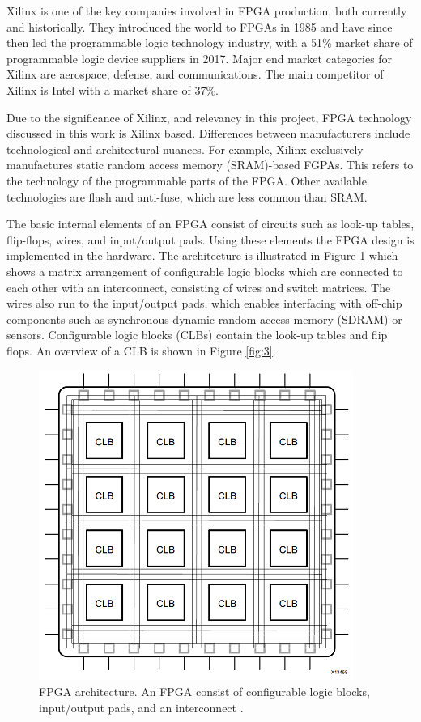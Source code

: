 \documentclass[12pt]{report}
\begin{document}
\par
Xilinx is one of the key companies involved in FPGA production, both currently and historically. They introduced the world to FPGAs in 1985 and have since then led the programmable logic technology industry, with a 51\% market share of programmable logic device suppliers in 2017. Major end market categories for Xilinx are aerospace, defense, and communications. The main competitor of Xilinx is Intel with a market share of 37\%. \citep{XilHist}\citep{XilShare}
\par 
Due to the significance of Xilinx, and relevancy in this project, FPGA technology discussed in this work is Xilinx based. Differences between manufacturers include technological and architectural nuances. For example, Xilinx exclusively manufactures static random access memory (SRAM)-based FGPAs. This refers to the technology of the programmable parts of the FPGA. Other available technologies are flash and anti-fuse, which are less common than SRAM. \citep{FPGAarch1}
\par
The basic internal elements of an FPGA consist of circuits such as look-up tables, flip-flops, wires, and input/output pads. Using these elements the FPGA design is implemented in the hardware.
The architecture is illustrated in Figure \ref{fig:2} which shows a matrix arrangement of configurable logic blocks which are connected to each other with an interconnect, consisting of wires and switch matrices. The wires also run to the input/output pads, which enables interfacing with off-chip components such as synchronous dynamic random access memory (SDRAM) or sensors. Configurable logic blocks (CLBs) contain the look-up tables and flip flops. An overview of a CLB is shown in Figure \ref{fig:3}. \citep{XilFPGAIntro}

\begin{figure}[h]
    \centering
    \includegraphics[scale=0.55]{figures/basic_fpga.png}
    \caption{FPGA architecture. An FPGA consist of configurable logic blocks, input/output pads, and an interconnect \citep{XilFPGAIntro}.}
    \label{fig:2}
\end{figure}
\end{document}
